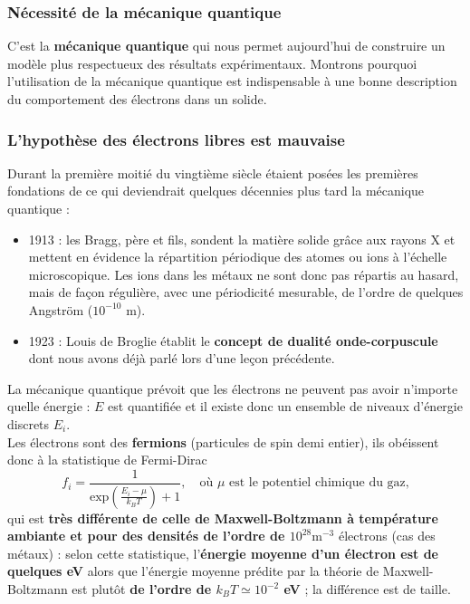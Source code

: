 \documentclass[11pt,a4paper]{report}
\begin{document}
\subsubsection{Nécessité de la mécanique quantique}

C'est la \textbf{mécanique quantique} qui nous permet aujourd'hui de construire un modèle plus respectueux des résultats expérimentaux. Montrons pourquoi l'utilisation de la mécanique quantique est indispensable à une bonne description du comportement des électrons dans un solide.\\

\subsubsection{L'hypothèse des électrons libres est mauvaise}

Durant la première moitié du vingtième siècle étaient posées les premières fondations de ce qui deviendrait quelques décennies plus tard la mécanique quantique :
\begin{itemize}
	\item 1913 : les Bragg, père et fils, sondent la matière solide grâce aux rayons X et mettent en évidence la répartition périodique des atomes ou ions à l'échelle microscopique. Les ions dans les métaux ne sont donc pas répartis au hasard, mais de façon régulière, avec une périodicité mesurable, de l'ordre de quelques Angström ($10^{-10}$ m).\\
	
	\item 1923 : Louis de Broglie établit le \textbf{concept de dualité onde-corpuscule} dont nous avons déjà parlé lors d'une leçon précédente.\\
\end{itemize}

La mécanique quantique prévoit que les électrons ne peuvent pas avoir n'importe quelle énergie : $E$ est quantifiée et il existe donc un ensemble de niveaux d'énergie discrets $E_i$.\\

Les électrons sont des \textbf{fermions} (particules de spin demi entier), ils obéissent donc à la statistique de Fermi-Dirac
\begin{equation}
	f_i = \frac{1}{\text{exp}\left(\frac{E_i - \mu}{k_B T} \right)+1}, \quad\text{où }\mu\text{ est le potentiel chimique du gaz,}
\end{equation} 
qui est \textbf{très différente de celle de Maxwell-Boltzmann à température ambiante et pour des densités de l'ordre de $10^{28} \text{m}^{-3}$} électrons (cas des métaux) : selon cette statistique, l'\textbf{énergie moyenne d'un électron est de quelques eV} alors que l'énergie moyenne prédite par la théorie de Maxwell-Boltzmann est plutôt \textbf{de l'ordre de $k_B T \simeq 10^{-2}$ eV} ; la différence est de taille.\\
\end{document}
